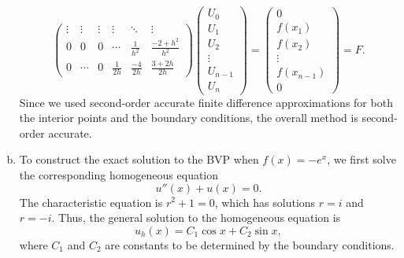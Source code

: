 \documentclass{article}
\begin{document}
\begin{enumerate}[(a)]
\begin{equation*}
\begin{pmatrix}
      \vdots & \vdots & \vdots & \vdots & \ddots & \vdots \\
      0 & 0 & 0 & \cdots & \frac{1}{h^2} & \frac{-2 + h^2}{h^2} \\
      0 & \cdots & 0 & \frac{1}{2h} & \frac{-4}{2h} & \frac{3 + 2h}{2h}
    \end{pmatrix}
    \begin{pmatrix}
      U_0 \\ U_1 \\ U_2 \\ \vdots \\ U_{n-1} \\ U_n
    \end{pmatrix}
    = \begin{pmatrix}
      0 \\ f(x_1) \\ f(x_2) \\ \vdots \\ f(x_{n-1}) \\ 0
    \end{pmatrix} = F.
  \end{equation*}
  Since we used second-order accurate finite difference approximations for both the interior points and the boundary conditions, the overall method is second-order accurate.
  \item To construct the exact solution to the BVP when $f(x) = -e^x$, we first solve the corresponding homogeneous equation
        \begin{equation*}
          u''(x) + u(x) = 0.
        \end{equation*}
        The characteristic equation is $r^2 + 1 = 0$, which has solutions $r = i$ and $r = -i$. Thus, the general solution to the homogeneous equation is
        \begin{equation*}
          u_h(x) = C_1 \cos x + C_2 \sin x,
        \end{equation*}
        where $C_1$ and $C_2$ are constants to be determined by the boundary conditions.


\end{enumerate}
\end{document}
